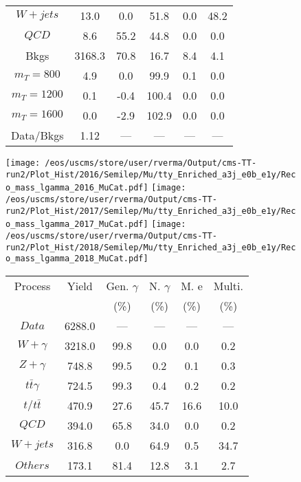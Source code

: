 \begin{figure}
\begin{minipage}[c]{0.32\textwidth}
{\begin{tabular}{cccccc}
$ W+jets $ &  13.0 &  0.0 &  51.8 &  0.0 &  48.2\\
$ QCD $ &  8.6 &  55.2 &  44.8 &  0.0 &  0.0\\
Bkgs &  3168.3 &  70.8 &  16.7 &  8.4 &  4.1\\
$ m_{T} = 800 $ &  4.9 &  0.0 &  99.9 &  0.1 &  0.0\\
$ m_{T} = 1200 $ &  0.1 &  -0.4 &  100.4 &  0.0 &  0.0\\
$ m_{T} = 1600 $ &  0.0 &  -2.9 &  102.9 &  0.0 &  0.0\\
Data/Bkgs &  1.12 &  --- &  --- &  --- &  ---\\
\hline
\end{tabular}
}
\end{minipage}
\end{figure}

\begin{figure}
\centering
\texttt{[image: /eos/uscms/store/user/rverma/Output/cms-TT-run2/Plot\_Hist/2016/Semilep/Mu/tty\_Enriched\_a3j\_e0b\_e1y/Reco\_mass\_lgamma\_2016\_MuCat.pdf]}
\texttt{[image: /eos/uscms/store/user/rverma/Output/cms-TT-run2/Plot\_Hist/2017/Semilep/Mu/tty\_Enriched\_a3j\_e0b\_e1y/Reco\_mass\_lgamma\_2017\_MuCat.pdf]}
\texttt{[image: /eos/uscms/store/user/rverma/Output/cms-TT-run2/Plot\_Hist/2018/Semilep/Mu/tty\_Enriched\_a3j\_e0b\_e1y/Reco\_mass\_lgamma\_2018\_MuCat.pdf]}
\begin{minipage}[c]{0.32\textwidth}
\centering
\tiny{
\begin{tabular}{cccccc}
\hline
Process & Yield & Gen. $\gamma$ & N. $\gamma$ & M. e & Multi. \\
 &  & (\%) & (\%) & (\%) & (\%)  \\
\hline
                                                                      $ Data $ &  6288.0 &  --- &  --- &  --- &  ---\\
$ W+\gamma $ &  3218.0 &  99.8 &  0.0 &  0.0 &  0.2\\
$ Z+\gamma $ &  748.8 &  99.5 &  0.2 &  0.1 &  0.3\\
$ t\bar{t}\gamma $ &  724.5 &  99.3 &  0.4 &  0.2 &  0.2\\
$ t/t\bar{t} $ &  470.9 &  27.6 &  45.7 &  16.6 &  10.0\\
$ QCD $ &  394.0 &  65.8 &  34.0 &  0.0 &  0.2\\
$ W+jets $ &  316.8 &  0.0 &  64.9 &  0.5 &  34.7\\
$ Others $ &  173.1 &  81.4 &  12.8 &  3.1 &  2.7\\

\end{tabular}}
\end{minipage}
\end{figure}

